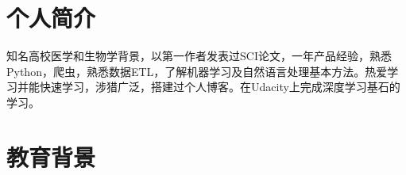 \documentclass[11pt,a4paper]{moderncv}
\title{ }
\begin{document}
 
 \makecvtitle
 
  \section{个人简介}
 知名高校医学和生物学背景，以第一作者发表过SCI论文，一年产品经验，熟悉Python，爬虫，熟悉数据ETL，了解机器学习及自然语言处理基本方法。热爱学习并能快速学习，涉猎广泛，搭建过个人博客。在Udacity上完成深度学习基石的学习。
  
 \section{教育背景}

\end{document}
